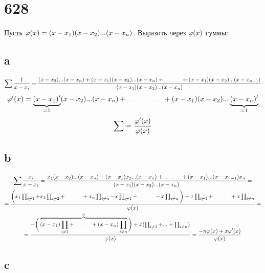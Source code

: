 \section{628}

Пусть $ \varphi(x) = (x - x_1)(x - x_2)...(x - x_n) $. Выразить через $ \varphi(x) $ суммы:

\subsection{a}

$$ \sum \frac1{x - x_i} = \frac{(x - x_2)...(x - x_n) + (x - x_1)(x - x_3)...(x - x_n) + \widedots[3em] + (x - x_1)(x - x_2)...(x - x_{n - 1})}{(x - x_1)(x - x_2)...(x - x_n)} $$
$$ \vphi'(x) = \underbrace{(x - x_1)'}_{= 1}(x - x_2)...(x - x_n) + \widedots[5em] + (x - x_1)(x - x_2)...\underbrace{(x - x_n)'}_{= 1} $$
$$ \sum = \frac{\varphi'(x)}{\varphi(x)} $$

\subsection{b}

\begin{multline*}
    \sum \frac{x_i}{x - x_i} = \frac{x_1(x - x_2)...(x - x_n) + (x - x_1)x_2...(x - x_n) + \widedots[3em] + (x - x_1)...(x - x_{n - 1})x_n}{(x - x_1)(x - x_2)...(x - x_n)} = \\
    = \frac{\bigg( x_1\prod_{i \ne 1} + x_2\prod_{i \ne 2} + \widedots[3em] + x_n\prod_{i \ne n} - x\prod_{i \ne 1} - \widedots[3em] - x\prod_{i \ne n} \bigg) + x\prod_{i \ne 1} + \widedots[3em] + x\prod_{i \ne n}}{\vphi(x)} = \\
    = \frac{-\bigg(\overbrace{(x - x_1)\prod_{i \ne 1} + \widedots[3em] + (x - x_n)\prod_{i \ne n}}^n \bigg) + x(\prod_{i \ne 1} + ... + \prod_{i \ne n})}{\vphi(x)} = \frac{-n\vphi(x) + x\vphi'(x)}{\vphi(x)}
\end{multline*}

\subsection{c}

